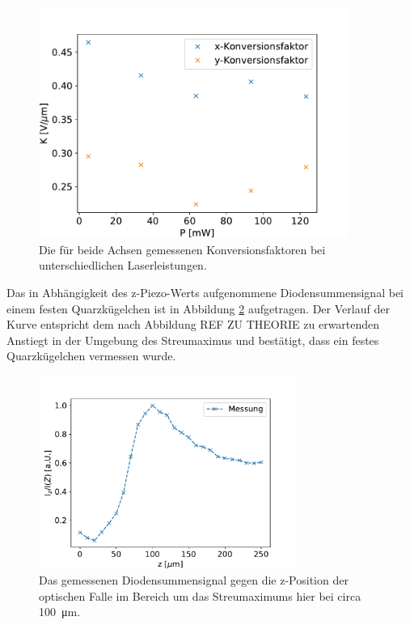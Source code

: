             \begin{figure}[h]
            \centering
            \includegraphics[width = 0.9\textwidth]{Konversion.pdf}
            \caption{Die für beide Achsen gemessenen Konversionsfaktoren bei unterschiedlichen Laserleistungen.}
            \label{fig:Konversion}
            \end{figure}
            \FloatBarrier
            \newpage
            Das in Abhängigkeit des z-Piezo-Werts aufgenommene Diodensummensignal bei einem festen Quarzkügelchen ist in Abbildung \ref{fig:Diodensumme} aufgetragen. Der Verlauf der Kurve entspricht dem
            nach Abbildung REF ZU THEORIE zu erwartenden Anstiegt in der Umgebung des Streumaximus und bestätigt, dass ein festes Quarzkügelchen vermessen wurde.
            \begin{figure}[h]
            \centering
            \includegraphics[width = 0.75\textwidth]{Diodensumme.pdf}
            \caption{Das gemessenen Diodensummensignal gegen die z-Position der optischen Falle im Bereich um das Streumaximums hier bei circa \SI{100}{\micro\metre}.}
            \label{fig:Diodensumme}
            \end{figure}
            \FloatBarrier



